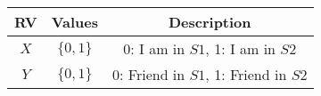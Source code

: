 
\begin{center}
\begin{tabular}{|c|c|c|}
\hline
\textbf{RV}& \textbf{Values} & \textbf{Description} \\ \hline
$X$		   & 	$\{0,1\}$		&   0: I am in $S1$, 1: I am in $S2$\\ \hline
$Y$ 		   & 	$\{0,1\}$	&	0: Friend in $S1$, 1: Friend in $S2$\\ \hline
\end{tabular}
\end{center}